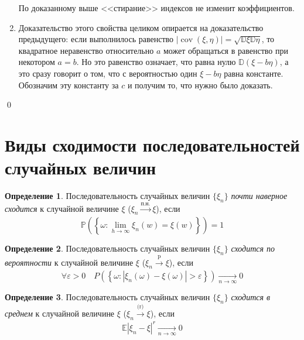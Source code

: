 \documentclass[oneside,final,14pt]{extreport}
\renewenvironment{proof}{{\bfseries Доказательство.}}{\qed}
\theoremstyle{plain}
\theoremstyle{definition}
\newtheorem*{defn}{Определение}
\theoremstyle{named}
\begin{document}
\begin{proof}
\begin{enumerate}
    По доказанному выше <<стирание>> индексов не изменит коэффициентов.

    \item Доказательство этого свойства целиком опирается на доказательство предыдущего: если выполнилось равенство $|\operatorname{cov}(\xi, \eta)|=\sqrt{\mathbb{D} \xi \mathbb{D} \eta}$, то квадратное неравенство относительно $a$ может обращаться в равенство при некотором $a = b$. Но это равенство означает, что равна нулю $\mathbb{D}(\xi-b \eta)$, а это сразу говорит о том, что с вероятностью один $\xi - b\eta$ равна константе. Обозначим эту константу за $c$ и получим то, что нужно было доказать.

\end{enumerate}
\end{proof}

\section{Виды сходимости последовательностей случайных величин}
\begin{defn}
    Последовательность случайных величин $\{\xi_n\}$ {\it почти наверное сходится} к случайной величине $\xi$ ($\xi_n \xrightarrow[]{\text{п.н.}} \xi$), если
    \begin{equation*}
        \mathbb{P}\left(\left\{\omega: \lim\limits _{h \rightarrow \infty} \xi_{n}(w)=\xi(w)\right\}\right)=1
    \end{equation*}
\end{defn}

\begin{defn}
    Последовательность случайных величин $\{\xi_n\}$ {\it сходится по вероятности} к случайной величине $\xi$ ($\xi_n \xrightarrow[]{\text{p}} \xi$), если
    \begin{equation*}
        \forall \varepsilon>0 \quad P\left(\left\{\omega: |\xi_{n}(\omega)-\xi(\omega)|>\varepsilon\right\}\right) \xrightarrow[n \to \infty]{} 0
    \end{equation*}
\end{defn}

\begin{defn}
    Последовательность случайных величин $\{\xi_n\}$ {\it сходится в среднем} к случайной величине $\xi$ ($\xi_n \xrightarrow[]{\text{(r)}} \xi$), если
    \begin{equation*}
        \mathbb{E}\left|\xi_{n}-\xi\right|^{r} \xrightarrow[n \to \infty]{} 0
    \end{equation*}
\end{defn}
\end{document}

